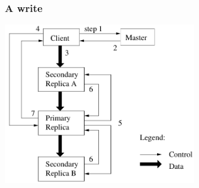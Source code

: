 \documentclass{beamer}
\newcommand{\slideheight}{7cm}
\begin{document}
\begin{frame}
 \frametitle{A write}
 \centering
 \includegraphics[height=\slideheight]{figures/GFSflow.png}
\end{frame}
\end{document}
